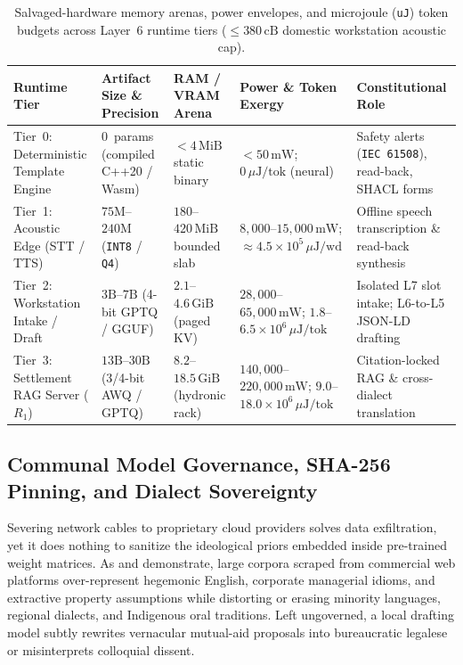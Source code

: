 \begin{table}[htbp]
\centering
\small
\begin{tabular}{@{}p{}p{}p{}p{}p{}@{}}
\toprule
\textbf{Runtime Tier} & \textbf{Artifact Size \& Precision} & \textbf{RAM / VRAM Arena} & \textbf{Power \& Token Exergy} & \textbf{Constitutional Role} \\
\midrule
Tier~0: Deterministic Template Engine & $0$~params (compiled C++20 / Wasm) & $< 4\,\mathrm{MiB}$ static binary & $< 50\,\mathrm{mW}$; $0\,\mu\mathrm{J/tok}$ (neural) & Safety alerts (\texttt{IEC 61508}), read-back, SHACL forms \\
\addlinespace
Tier~1: Acoustic Edge (STT / TTS) & $75\mathrm{M}$--$240\mathrm{M}$ (\texttt{INT8} / \texttt{Q4}) & $180$--$420\,\mathrm{MiB}$ bounded slab & $8{,}000$--$15{,}000\,\mathrm{mW}$; $\approx 4.5 \times 10^5\,\mu\mathrm{J/wd}$ & Offline speech transcription \& read-back synthesis \\
\addlinespace
Tier~2: Workstation Intake / Draft & $3\mathrm{B}$--$7\mathrm{B}$ (4-bit GPTQ / GGUF) & $2.1$--$4.6\,\mathrm{GiB}$ (paged KV) & $28{,}000$--$65{,}000\,\mathrm{mW}$; $1.8$--$6.5 \times 10^6\,\mu\mathrm{J/tok}$ & Isolated L7 slot intake; L6-to-L5 JSON-LD drafting \\
\addlinespace
Tier~3: Settlement RAG Server ($R_1$) & $13\mathrm{B}$--$30\mathrm{B}$ (3/4-bit AWQ / GPTQ) & $8.2$--$18.5\,\mathrm{GiB}$ (hydronic rack) & $140{,}000$--$220{,}000\,\mathrm{mW}$; $9.0$--$18.0 \times 10^6\,\mu\mathrm{J/tok}$ & Citation-locked RAG \& cross-dialect translation \\
\bottomrule
\end{tabular}
\caption{Salvaged-hardware memory arenas, power envelopes, and microjoule (\texttt{uJ}) token budgets across Layer~6 runtime tiers ($\le 380\,\mathrm{cB}$ domestic workstation acoustic cap).}
\label{tab:edge-llm-tiers}
\end{table}

\subsection{Communal Model Governance, SHA-256 Pinning, and Dialect Sovereignty}
\label{subsec:model-governance-supply-chain}

Severing network cables to proprietary cloud providers solves data exfiltration, yet it does nothing to sanitize the ideological priors embedded inside pre-trained weight matrices. As \textcite{bender2021parrots} and \textcite{noble2018} demonstrate, large corpora scraped from commercial web platforms over-represent hegemonic English, corporate managerial idioms, and extractive property assumptions while distorting or erasing minority languages, regional dialects, and Indigenous oral traditions. Left ungoverned, a local drafting model subtly rewrites vernacular mutual-aid proposals into bureaucratic legalese or misinterprets colloquial dissent.

